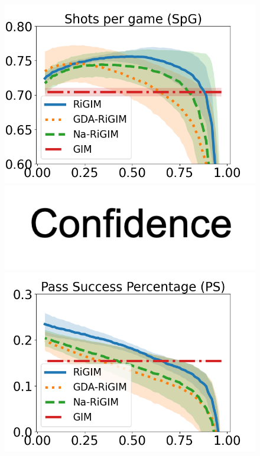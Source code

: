 \documentclass[letterpaper]{article} %
\begin{document}
\begin{figure}[htbp]
\begin{minipage}{0.16\textwidth}
    \includegraphics[scale=0.16]{figures/soccer_risk_curve_SpG_shadow.png}\par
    \vspace{-0.05in}
    \includegraphics[scale=0.12]{figures/confidence_x_label.png}
    \end{minipage}
    \begin{minipage}{0.16\textwidth}
    \centering
    \includegraphics[scale=0.16]{figures/soccer_risk_curve_PS_shadow.png}\par

\end{minipage}
\end{figure}
\end{document}
